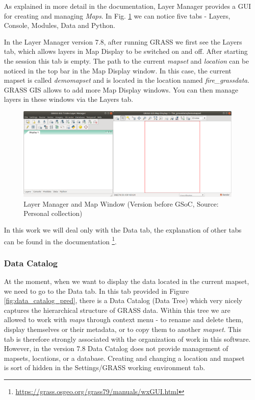 \documentclass[a4paper,10pt,twoside]{article}
\begin{document}
As explained in more detail in the documentation, Layer Manager provides a GUI for creating and managing \textit{Maps}. In Fig. \ref{fig:empty_layers1} we can notice five tabs - Layers, Console, Modules, Data and Python.

In the Layer Manager version 7.8, after running GRASS we first see the Layers tab, which allows layers in Map Display to be switched on and off. After starting the session this tab is empty. The path to the current \textit{mapset} and \textit{location} can be noticed in the top bar in the Map Display window. In this case, the current mapset is called \textit{demomapset} and is located in the location named \textit{fire\_grassdata}. GRASS GIS allows to add more Map Display windows. You can then manage layers in these windows via the Layers tab.
\vspace{0.3cm}
\begin{figure}[hbt!] 
\begin{center}
\includegraphics[width=17cm]{../pictures/empty_layers1.png} 
\caption[Layer Manager and Map Window (Version before GSoC)]{Layer Manager and Map Window  (Version before GSoC, Source: Personal collection)}
\label{fig:empty_layers1}
\end{center}
\end{figure}

\noindent In this work we will deal only with the Data tab, the explanation of other tabs can be found in the documentation \footnote{\url{https://grass.osgeo.org/grass79/manuals/wxGUI.html}}.
 
\newpage
\vspace*{-1cm}
\subsubsection{Data Catalog}

At the moment, when we want to display the data located in the current mapset, we need to go to the Data tab. In this tab provided in Figure \ref{fig:data_catalog_pred}, there is a Data Catalog (Data Tree) which very nicely captures the hierarchical structure of GRASS data. Within this tree we are allowed to work with \textit{maps} through context menu - to rename and delete them, display themselves or their metadata, or to copy them to another \textit{mapset}. This tab is therefore strongly associated with the organization of work in this software. However, in the version 7.8 Data Catalog does not provide management of mapsets, locations, or a database. Creating and changing a location and mapset is sort of hidden in the Settings/GRASS working environment tab.
\end{document}
